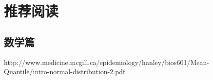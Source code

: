 \chapter{推荐阅读}
    \section{数学篇}
    http://www.medicine.mcgill.ca/epidemiology/hanley/bios601/Mean-Quantile/intro-normal-distribution-2.pdf
